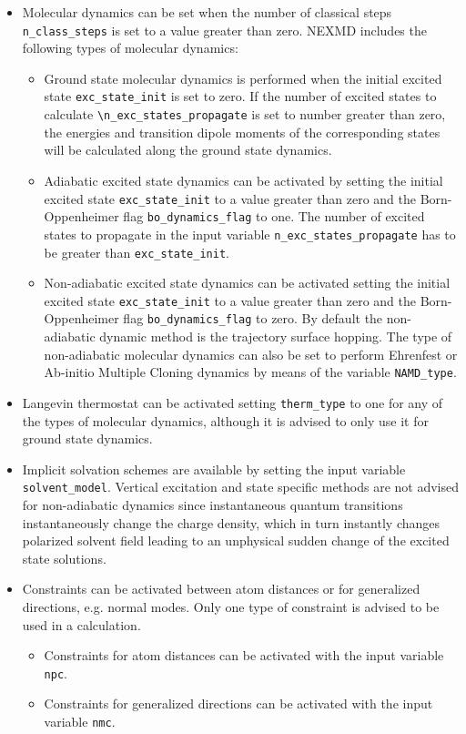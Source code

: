 \begin{itemize}
\item Molecular dynamics can be set when the number of classical steps \verb+n_class_steps+ is set to a value greater than zero. NEXMD includes the following types of molecular dynamics:
    \begin{itemize}
        \item Ground state molecular dynamics is performed when the initial excited state \verb+exc_state_init+ is set to zero. If the number of excited states to calculate \verb+\n_exc_states_propagate+ is set to number greater than zero, the energies and transition dipole moments of the corresponding states will be calculated along the ground state dynamics.
        \item Adiabatic excited state dynamics can be activated by setting the initial excited state \verb+exc_state_init+ to a value greater than zero and the Born-Oppenheimer flag \verb+bo_dynamics_flag+ to one. The number of excited states to propagate in the input variable \verb+n_exc_states_propagate+ has to be greater than \verb+exc_state_init+.
        \item Non-adiabatic excited state dynamics can be activated setting the initial excited state \verb+exc_state_init+ to a value greater than zero and the Born-Oppenheimer flag \verb+bo_dynamics_flag+ to zero. By default the non-adiabatic dynamic method is the trajectory surface hopping. The type of non-adiabatic molecular dynamics can also be set to perform Ehrenfest or Ab-initio Multiple Cloning dynamics by means of the variable \verb+NAMD_type+.
    \end{itemize}

\item Langevin thermostat can be activated setting \verb+therm_type+ to one for any of the types of molecular dynamics, although it is advised to only use it for ground state dynamics. 

\item Implicit solvation schemes are available by setting the input variable \verb+solvent_model+. Vertical excitation and state specific methods are not advised for non-adiabatic dynamics since instantaneous quantum transitions instantaneously change the charge density, which in turn instantly changes polarized solvent field leading to an unphysical sudden change of the excited state solutions.

\item Constraints can be activated between atom distances or for generalized directions, e.g. normal modes. Only one type of constraint is advised to be used in a calculation.
    \begin{itemize}
        \item Constraints for atom distances can be activated with the input variable \verb+npc+.
        \item Constraints for generalized directions can be activated with the input variable \verb+nmc+.
    \end{itemize}

\end{itemize}